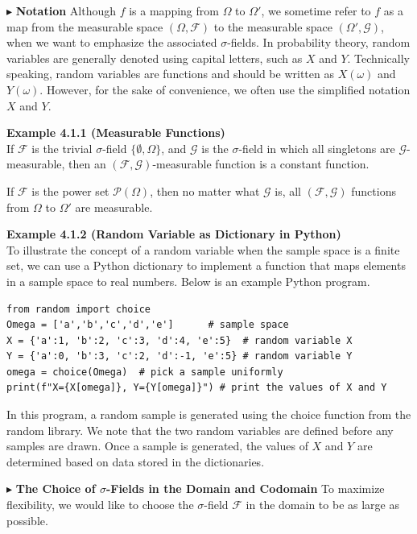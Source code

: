 \noindent$\blacktriangleright$ \textbf{Notation} Although $f$ is a mapping from $\Omega$ to $\Omega'$, we sometime refer to $f$ as a map from the measurable space $(\Omega, \mathcal{F})$ to the measurable space $(\Omega', \mathcal{G})$, when we want to emphasize the associated $\sigma$-fields. In probability theory, random variables are generally denoted using capital letters, such as $X$ and $Y$. Technically speaking, random variables are functions and should be written as $X(\omega)$ and $Y(\omega)$. However, for the sake of convenience, we often use the simplified notation $X$ and $Y$.

\textbf{Example 4.1.1 (Measurable Functions)} \\
If $\mathcal{F}$ is the trivial $\sigma$-field $\{\emptyset, \Omega\}$, and $\mathcal{G}$ is the $\sigma$-field in which all singletons are $\mathcal{G}$-measurable, then an $(\mathcal{F}, \mathcal{G})$-measurable function is a constant function.

If $\mathcal{F}$ is the power set $\mathcal{P}(\Omega)$, then no matter what $\mathcal{G}$ is, all $(\mathcal{F}, \mathcal{G})$ functions from $\Omega$ to $\Omega'$ are measurable.

\textbf{Example 4.1.2 (Random Variable as Dictionary in Python)} \\
To illustrate the concept of a random variable when the sample space is a finite set, we can use a Python dictionary to implement a function that maps elements in a sample space to real numbers. Below is an example Python program.

\begin{verbatim}
from random import choice
Omega = ['a','b','c','d','e']      # sample space
X = {'a':1, 'b':2, 'c':3, 'd':4, 'e':5}  # random variable X
Y = {'a':0, 'b':3, 'c':2, 'd':-1, 'e':5} # random variable Y
omega = choice(Omega)  # pick a sample uniformly
print(f"X={X[omega]}, Y={Y[omega]}") # print the values of X and Y
\end{verbatim}

In this program, a random sample is generated using the choice function from the random library. We note that the two random variables are defined before any samples are drawn. Once a sample is generated, the values of $X$ and $Y$ are determined based on data stored in the dictionaries.

\noindent$\blacktriangleright$ \textbf{The Choice of $\sigma$-Fields in the Domain and Codomain} To maximize flexibility, we would like to choose the $\sigma$-field $\mathcal{F}$ in the domain to be as large as possible.

